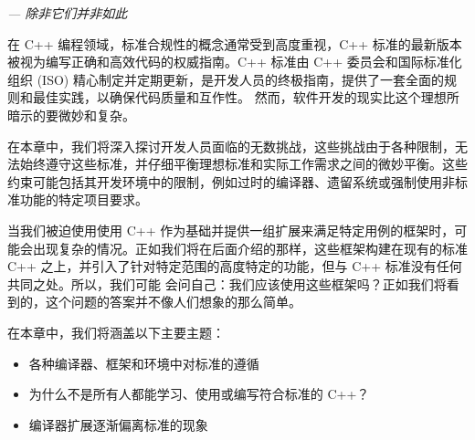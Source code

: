 
\begin{flushright}
\textit{--- 除非它们并非如此}
\end{flushright}

在 C++ 编程领域，标准合规性的概念通常受到高度重视，C++ 标准的最新版本被视为编写正确和高效代码的权威指南。C++ 标准由 C++ 委员会和国际标准化组织 (ISO) 精心制定并定期更新，是开发人员的终极指南，提供了一套全面的规则和最佳实践，以确保代码质量和互作性。 然而，软件开发的现实比这个理想所暗示的要微妙和复杂。

在本章中，我们将深入探讨开发人员面临的无数挑战，这些挑战由于各种限制，无法始终遵守这些标准，并仔细平衡理想标准和实际工作需求之间的微妙平衡。这些约束可能包括其开发环境中的限制，例如过时的编译器、遗留系统或强制使用非标准功能的特定项目要求。

当我们被迫使用使用 C++ 作为基础并提供一组扩展来满足特定用例的框架时，可能会出现复杂的情况。正如我们将在后面介绍的那样，这些框架构建在现有的标准 C++ 之上，并引入了针对特定范围的高度特定的功能，但与 C++ 标准没有任何共同之处。所以，我们可能
会问自己：我们应该使用这些框架吗？正如我们将看到的，这个问题的答案并不像人们想象的那么简单。

在本章中，我们将涵盖以下主要主题：

\begin{itemize}
\item 
各种编译器、框架和环境中对标准的遵循

\item 
为什么不是所有人都能学习、使用或编写符合标准的 C++？

\item 
编译器扩展逐渐偏离标准的现象
\end{itemize}